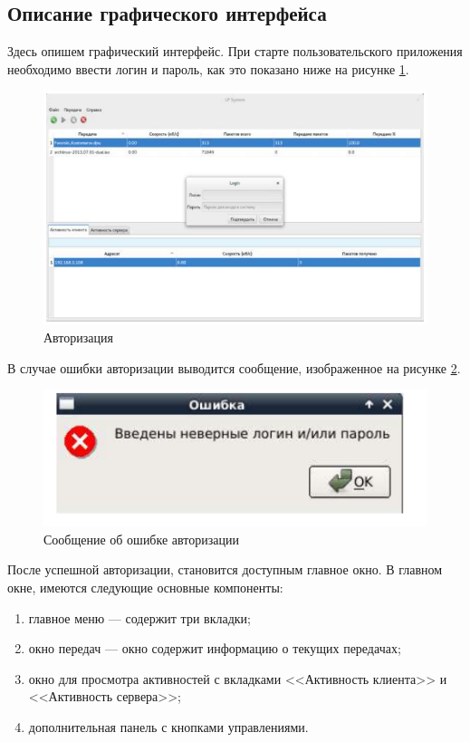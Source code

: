 \subsection{Описание графического интерфейса}
Здесь опишем графический интерфейс.
\newpar
При старте пользовательского приложения необходимо ввести логин и
пароль, как это показано ниже на рисунке \ref{login_window}.
\begin{figure}[!hbt]
    \centering
    \includegraphics[width=\textwidth]{login}
    \caption{Авторизация}\label{login_window}
\end{figure}
\newpar
В случае ошибки авторизации выводится сообщение, изображенное на рисунке \ref{auth_err}.
\begin{figure}[!hbt]
    \centering
    \includegraphics{auth_err}
    \caption{Сообщение об ошибке авторизации}\label{auth_err}
\end{figure}
\newpar
После успешной авторизации, становится доступным главное окно. В
главном окне, имеются следующие основные компоненты:
\begin{enumerate}
    \item главное меню --- содержит три вкладки;
    \item окно передач --- окно содержит информацию о текущих передачах;
    \item окно для просмотра активностей с вкладками <<Активность клиента>> и <<Активность сервера>>;
    \item дополнительная панель с кнопками управлениями.
\end{enumerate}

